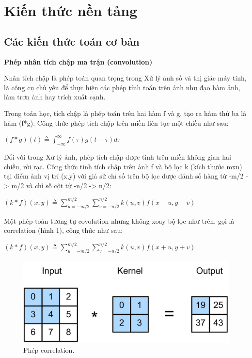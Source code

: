 \section{Kiến thức nền tảng}
\subsection{Các kiến thức toán cơ bản}
\textbf{Phép nhân tích chập ma trận (convolution)}

Nhân tích chập là phép toán quan trọng trong Xử lý ảnh số và thị giác máy tính, là công cụ chủ yếu để thực hiện
các phép tính toán trên ảnh như đạo hàm ảnh, làm trơn ảnh hay trích xuất cạnh.

Trong toán học, tích chập là phép toán trên hai hàm f và g, tạo ra hàm thứ ba là hàm (f*g). Công thức phép tích
chập trên miền liên tục một chiều như sau:

$(f*g)(t) \triangleq \displaystyle \int_{-\infty}^{\infty}f(\tau)g(t-\tau)d\tau$


Đối với trong Xử  lý ảnh, phép tích chập được tính trên miền không gian hai chiều, rời rạc. Công thức tính tích
chập trên ảnh f và bộ lọc k (kích thước mxn) tại điểm ảnh vị trí (x,y) với giả sử chỉ số trên bộ lọc được đánh số hàng từ -m/2 -> m/2
và chỉ số cột từ -n/2 -> n/2:

$(k*f)(x,y) \triangleq \displaystyle \sum_{u=-m/2}^{m/2}\displaystyle \sum_{v=-n/2}^{n/2}k(u,v)f(x-u,y-v)$

Một phép toán tương tự covolution nhưng không xoay bộ lọc như trên, gọi là correlation (hình 1), công thức như sau:

$(k*f)(x,y) \triangleq \displaystyle \sum_{u=-m/2}^{m/2}\displaystyle \sum_{v=-n/2}^{n/2}k(u,v)f(x+u,y+v)$
\begin{figure}[!ht]
    \begin{center}
        \includegraphics[width=\linewidth]{asset/image/correlation.jpg}
        \caption{Phép correlation.}
    \end{center}
\end{figure}


